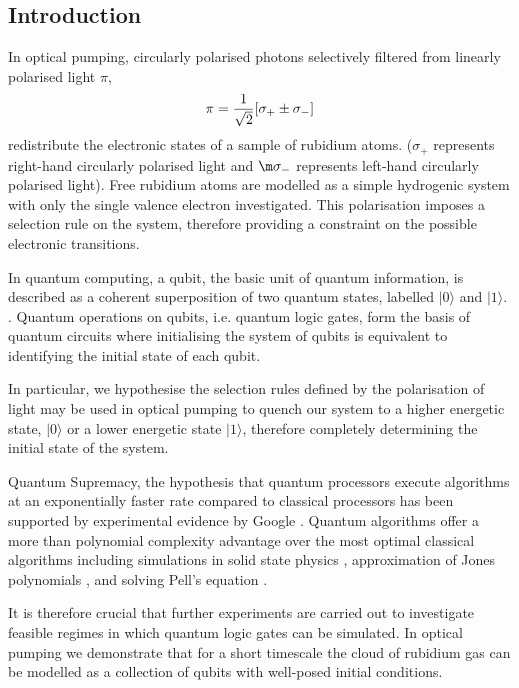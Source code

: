 \documentclass{article}
\begin{document}
\sloppy
\begin{multicols*}{2}

\setlength{\parindent}{4ex}
\setlength{\parskip}{0em}

\section{Introduction}

In optical pumping, circularly polarised photons selectively filtered from linearly polarised light $\pi$,
\begin{equation}\label{polarization}
\setlength{\abovedisplayskip}{3pt}
    \pi = \frac{1}{\sqrt{2}}[\sigma _{+} \pm \sigma_{-}]
\setlength{\belowdisplayskip}{3pt}
\end{equation}
 redistribute the electronic states of a sample of rubidium atoms. ($\sigma _{+}$ represents right-hand circularly polarised light and $\m \sigma_{-}$ represents left-hand circularly polarised light). Free rubidium atoms are modelled as a simple hydrogenic system with only the single valence electron investigated. This polarisation imposes a selection rule on the system, therefore providing a constraint on the possible electronic transitions. 

In quantum computing, a qubit, the basic unit of quantum information, is described as a coherent superposition of two quantum states, labelled $|0\rangle$ and $|1\rangle$. \cite{nielsen}. Quantum operations on qubits, i.e. quantum logic gates, form the basis of quantum circuits where initialising the system of qubits is equivalent to identifying the initial state of each qubit.

In particular, we hypothesise the selection rules defined by the polarisation of light may be used in optical pumping to quench our system to a higher energetic state, $|0\rangle$ or a lower  energetic state $|1\rangle$, therefore completely determining the initial state of the system. 

Quantum Supremacy, the hypothesis that quantum processors execute algorithms at an exponentially faster rate compared to classical processors has been supported by experimental evidence by Google \cite{arute}. Quantum algorithms offer a more than polynomial complexity advantage over the most optimal classical algorithms including simulations in solid state physics \cite{aspuru}, approximation of Jones polynomials \cite{wocjan}, and solving Pell's equation \cite{hallgren}.

It is therefore crucial that further experiments are carried out to investigate feasible regimes in which quantum logic gates can be simulated. In optical pumping we demonstrate that for a short timescale the cloud of rubidium gas can be modelled as a collection of qubits with well-posed initial conditions.



\end{multicols*}
\end{document}
